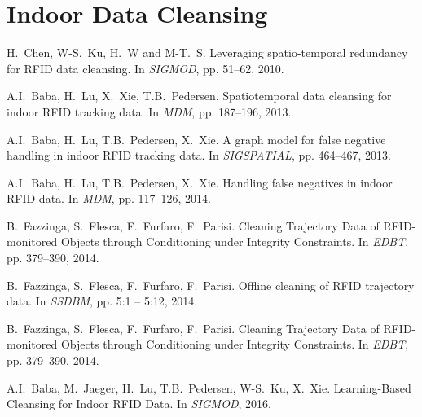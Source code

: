 \documentclass[a4paper, 11pt]{article} %
\begin{document}

\section{Indoor Data Cleansing}

\vspace{-25pt} %
\begin{thebibliography}{99}

H.~Chen, W-S.~Ku, H.~W and M-T.~S.
\newblock Leveraging spatio-temporal redundancy for RFID data cleansing.
\newblock In {\em SIGMOD}, pp. 51--62, 2010.

A.I.~Baba, H.~Lu, X.~Xie, T.B.~Pedersen.
\newblock Spatiotemporal data cleansing for indoor RFID tracking data.
\newblock In {\em MDM}, pp. 187--196, 2013.

A.I.~Baba, H.~Lu, T.B.~Pedersen, X.~Xie.
\newblock A graph model for false negative handling in indoor RFID tracking data.
\newblock In {\em SIGSPATIAL}, pp. 464--467, 2013.

A.I.~Baba, H.~Lu, T.B.~Pedersen, X.~Xie.
\newblock Handling false negatives in indoor RFID data.
\newblock In {\em MDM}, pp. 117--126, 2014.

B.~Fazzinga, S.~Flesca, F.~Furfaro, F.~Parisi.
\newblock Cleaning Trajectory Data of RFID-monitored Objects through Conditioning under Integrity Constraints.
\newblock In {\em EDBT}, pp. 379--390, 2014.

B.~Fazzinga, S.~Flesca, F.~Furfaro, F.~Parisi.
\newblock Offline cleaning of RFID trajectory data.
\newblock In {\em SSDBM}, pp. 5:1 -- 5:12, 2014.

B.~Fazzinga, S.~Flesca, F.~Furfaro, F.~Parisi.
\newblock Cleaning Trajectory Data of RFID-monitored Objects through Conditioning under Integrity Constraints.
\newblock In {\em EDBT}, pp. 379--390, 2014.

A.I.~Baba, M.~Jaeger, H.~Lu, T.B.~Pedersen, W-S.~Ku, X.~Xie.
\newblock Learning-Based Cleansing for Indoor RFID Data.
\newblock In {\em SIGMOD}, 2016.

\end{thebibliography}
\end{document}
